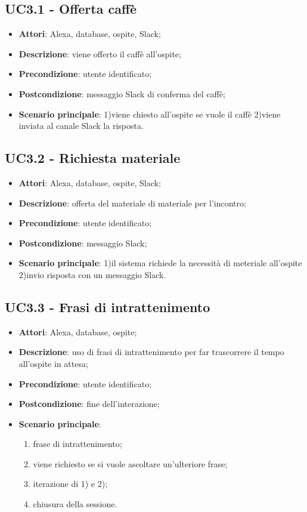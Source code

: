 \documentclass[../AnalisiDeiRequisiti.tex]{subfiles}
\begin{document}
\subsection{UC3.1 - Offerta caffè} 
\label{sssec:UC3.1} 
\begin{itemize} 
\item \textbf{Attori}: Alexa, database, ospite, Slack;
\item \textbf{Descrizione}: viene offerto il caffè all'ospite;
\item \textbf{Precondizione}: utente identificato;
\item \textbf{Postcondizione}: messaggio Slack di conferma del caffè;
\item \textbf{Scenario principale}: 1)viene chiesto all'ospite se vuole il caffè
2)viene inviata al canale Slack la risposta.\end{itemize} 
\subsection{UC3.2 - Richiesta materiale} 
\label{sssec:UC3.2} 
\begin{itemize} 
\item \textbf{Attori}: Alexa, database, ospite, Slack;
\item \textbf{Descrizione}: offerta del materiale di materiale per l'incontro;
\item \textbf{Precondizione}: utente identificato;
\item \textbf{Postcondizione}: messaggio Slack;
\item \textbf{Scenario principale}: 1)il sistema richiede la necessità di meteriale all'ospite
2)invio risposta con un messaggio Slack.\end{itemize} 
\subsection{UC3.3 - Frasi di intrattenimento} 
\label{sssec:UC3.3} 
\begin{itemize} 
\item \textbf{Attori}: Alexa, database, ospite;
\item \textbf{Descrizione}: uso di frasi di intrattenimento per far trascorrere il tempo all'ospite in attesa;
\item \textbf{Precondizione}: utente identificato;
\item \textbf{Postcondizione}: fine dell'interazione;
\item \textbf{Scenario principale}: 
	\begin{enumerate}
		\item frase di intrattenimento;
		\item viene richiesto se si vuole ascoltare un'ulteriore frase;
		\item iterazione di 1) e 2);
		\item chiusura della sessione.
	\end{enumerate}
\end{itemize} 
\newpage
\end{document}
